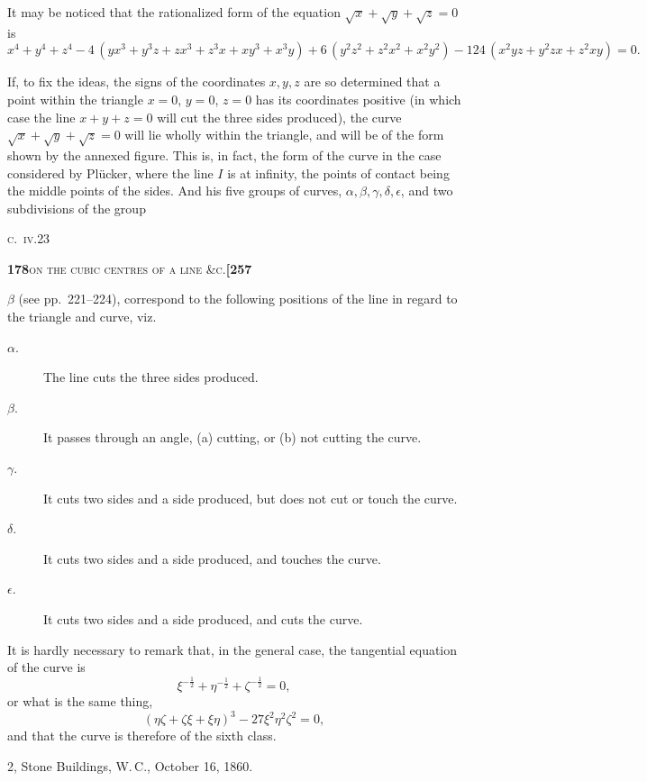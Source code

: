 \documentclass[11pt]{article}
\begin{document}
It may be noticed that the rationalized form of the equation $\sqrt{x} + \sqrt{y} + \sqrt{z} = 0$ is
\[
x^4 + y^4 + z^4 - 4\,(yx^3 + y^3z + zx^3 + z^3x + xy^3 + x^3y) + 6\,(y^2z^2 + z^2x^2 + x^2y^2) - 124\,(x^2yz + y^2zx + z^2xy) = 0.
\]

If, to fix the ideas, the signs of the coordinates $x, y, z$ are so determined that a point within the triangle $x = 0$, $y = 0$, $z = 0$ has its coordinates positive (in which case the line $x + y + z = 0$ will cut the three sides produced), the curve $\sqrt{x} + \sqrt{y} + \sqrt{z} = 0$ will lie wholly within the triangle, and will be of the form shown by the annexed figure. This is, in fact, the form of the curve in the case considered by Plücker, where the line $I$ is at infinity, the points of contact being the middle points of the sides. And his five groups of curves, $\alpha, \beta, \gamma, \delta, \epsilon$, and two subdivisions of the group

\hfill\textsc{c.~iv.}\hfill 23

\newpage

\noindent\textbf{178}\hfill\textsc{on the cubic centres of a line \&c.}\hfill\textbf{[257}

\medskip

\noindent $\beta$ (see pp.~221--224), correspond to the following positions of the line in regard to the triangle and curve, viz.
\begin{description}
\item[$\alpha$.] The line cuts the three sides produced.
\item[$\beta$.] It passes through an angle, (a) cutting, or (b) not cutting the curve.
\item[$\gamma$.] It cuts two sides and a side produced, but does not cut or touch the curve.
\item[$\delta$.] It cuts two sides and a side produced, and touches the curve.
\item[$\epsilon$.] It cuts two sides and a side produced, and cuts the curve.
\end{description}

It is hardly necessary to remark that, in the general case, the tangential equation of the curve is
\[
\xi^{-\frac{1}{2}} + \eta^{-\frac{1}{2}} + \zeta^{-\frac{1}{2}} = 0,
\]
or what is the same thing,
\[
(\eta\zeta + \zeta\xi + \xi\eta)^3 - 27\xi^2\eta^2\zeta^2 = 0,
\]
and that the curve is therefore of the sixth class.

\medskip

\hfill 2, Stone Buildings, W.\,C., October 16, 1860.
\end{document}
